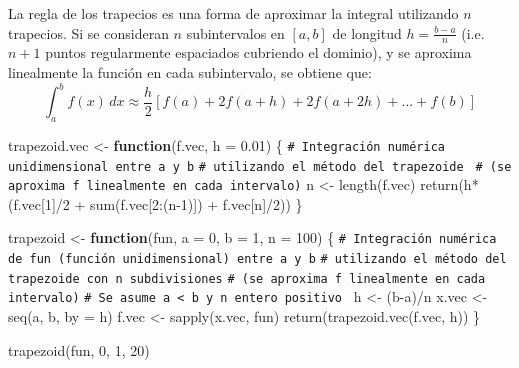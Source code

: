 \documentclass[
]{book}
\newenvironment{Shaded}{\begin{snugshade}}{\end{snugshade}}
\newcommand{\AttributeTok}[1]{\textcolor[rgb]{0.77,0.63,0.00}{#1}}
\newcommand{\CommentTok}[1]{\textcolor[rgb]{0.56,0.35,0.01}{\textit{#1}}}
\newcommand{\ControlFlowTok}[1]{\textcolor[rgb]{0.13,0.29,0.53}{\textbf{#1}}}
\newcommand{\DecValTok}[1]{\textcolor[rgb]{0.00,0.00,0.81}{#1}}
\newcommand{\FloatTok}[1]{\textcolor[rgb]{0.00,0.00,0.81}{#1}}
\newcommand{\FunctionTok}[1]{\textcolor[rgb]{0.00,0.00,0.00}{#1}}
\newcommand{\NormalTok}[1]{#1}
\newcommand{\OtherTok}[1]{\textcolor[rgb]{0.56,0.35,0.01}{#1}}
\newcommand{\SpecialCharTok}[1]{\textcolor[rgb]{0.00,0.00,0.00}{#1}}
\theoremstyle{break}
\theoremstyle{nonumberplain}
\renewcommand{\CommentTok}[1]{\textcolor[rgb]{0.41,0.41,0.41}{\texttt{#1}}}
\begin{document}
La regla de los trapecios es una forma de aproximar la integral utilizando \(n\) trapecios.
Si se consideran \(n\) subintervalos en \([a,b]\) de longitud \(h= \frac{b-a}{n}\)
(i.e.~\(n + 1\) puntos regularmente espaciados cubriendo el dominio), y
se aproxima linealmente la función en cada subintervalo, se obtiene que:
\[\int_a^b f(x)\, dx \approx \frac{h}{2} [f(a)+2f(a+h)+2f(a+2h)+...+f(b)]\]

\begin{Shaded}
\begin{Highlighting}[]
\NormalTok{trapezoid.vec }\OtherTok{\textless{}{-}} \ControlFlowTok{function}\NormalTok{(f.vec, }\AttributeTok{h =} \FloatTok{0.01}\NormalTok{) \{}
\CommentTok{\# Integración numérica unidimensional entre a y b}
\CommentTok{\# utilizando el método del trapezoide }
\CommentTok{\# (se aproxima f linealmente en cada intervalo)}
\NormalTok{  n }\OtherTok{\textless{}{-}} \FunctionTok{length}\NormalTok{(f.vec) }
  \FunctionTok{return}\NormalTok{(h}\SpecialCharTok{*}\NormalTok{(f.vec[}\DecValTok{1}\NormalTok{]}\SpecialCharTok{/}\DecValTok{2} \SpecialCharTok{+} \FunctionTok{sum}\NormalTok{(f.vec[}\DecValTok{2}\SpecialCharTok{:}\NormalTok{(n}\DecValTok{{-}1}\NormalTok{)]) }\SpecialCharTok{+}\NormalTok{ f.vec[n]}\SpecialCharTok{/}\DecValTok{2}\NormalTok{))}
\NormalTok{\}}

\NormalTok{trapezoid }\OtherTok{\textless{}{-}} \ControlFlowTok{function}\NormalTok{(fun, }\AttributeTok{a =} \DecValTok{0}\NormalTok{, }\AttributeTok{b =} \DecValTok{1}\NormalTok{, }\AttributeTok{n =} \DecValTok{100}\NormalTok{) \{}
\CommentTok{\# Integración numérica de fun (función unidimensional) entre a y b}
\CommentTok{\# utilizando el método del trapezoide con n subdivisiones}
\CommentTok{\# (se aproxima f linealmente en cada intervalo)}
\CommentTok{\# Se asume a \textless{} b y n entero positivo }
\NormalTok{  h }\OtherTok{\textless{}{-}}\NormalTok{ (b}\SpecialCharTok{{-}}\NormalTok{a)}\SpecialCharTok{/}\NormalTok{n}
\NormalTok{  x.vec }\OtherTok{\textless{}{-}} \FunctionTok{seq}\NormalTok{(a, b, }\AttributeTok{by =}\NormalTok{ h)}
\NormalTok{  f.vec }\OtherTok{\textless{}{-}} \FunctionTok{sapply}\NormalTok{(x.vec, fun)}
  \FunctionTok{return}\NormalTok{(}\FunctionTok{trapezoid.vec}\NormalTok{(f.vec, h))}
\NormalTok{\}}

\FunctionTok{trapezoid}\NormalTok{(fun, }\DecValTok{0}\NormalTok{, }\DecValTok{1}\NormalTok{, }\DecValTok{20}\NormalTok{)}
\end{Highlighting}
\end{Shaded}
\end{document}
